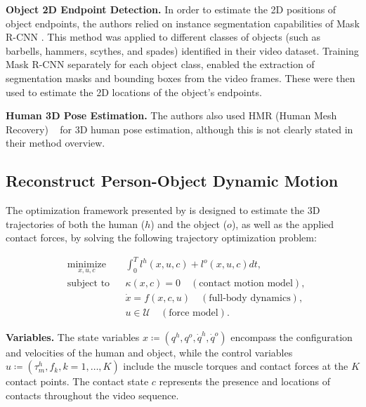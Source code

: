 \noindent\textbf{Object 2D Endpoint Detection.} In order to estimate the 2D positions of object endpoints, the authors relied on instance segmentation 
capabilities of Mask R-CNN \cite{he2017mask}. This method was applied to different classes of objects (such as barbells, hammers, scythes, 
and spades) identified in their video dataset. Training Mask R-CNN separately for each object class, enabled the extraction of segmentation masks
and bounding boxes from the video frames. These were then used to estimate the 2D locations of the object's endpoints.

\noindent\textbf{Human 3D Pose Estimation.} The authors also used HMR (Human Mesh Recovery) ~\cite{kanazawa2018end} for 3D human pose estimation, although this 
is not clearly stated in their method overview.


\subsection{Reconstruct Person-Object Dynamic Motion}
\label{subsec:reconstruct_original}

The optimization framework presented by \citet{li2019estimating} is designed to estimate the 3D trajectories of both the human ($h$) and the object ($o$), 
as well as the applied contact forces, by solving the following trajectory optimization problem: 

\begin{equation*}
    \begin{aligned}
        & \underset{x,u,c}{\text{minimize}}
        & & \int_{0}^{T} l^h(x, u, c) + l^o(x, u, c)dt, \\
        & \text{subject to}
        & & \kappa(x, c) = 0 \quad (\text{contact motion model}), \\
        &&& \dot{x} = f (x, c, u) \quad (\text{full-body dynamics}), \\
        &&& u \in \mathcal{U} \quad (\text{force model}).
    \end{aligned}
\end{equation*}

\noindent\textbf{Variables.} The state variables \(x \coloneqq (q^h, q^o, \dot{q}^h, \dot{q}^o)\) encompass the configuration and velocities of 
the human and object, while the control variables \(u \coloneqq (\tau_m^h, f_k, k=1, \dots, K)\) include the muscle torques and contact forces 
at the \(K\) contact points. The contact state \(c\) represents the presence and locations of contacts throughout the video sequence. 

